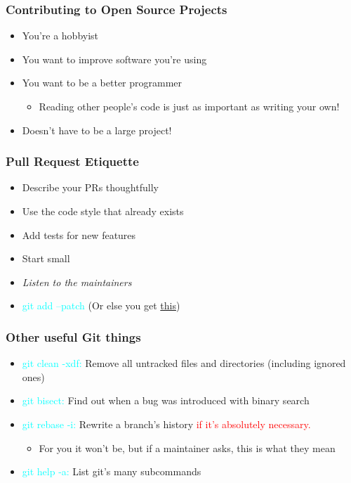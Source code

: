 \documentclass[glossy]{beamer}
\begin{document}
\begin{frame}[fragile=singleslide]
  \frametitle{Contributing to Open Source Projects}

  \begin{itemize}
    \item You're a hobbyist
    \item You want to improve software you're using
    \item You want to be a better programmer
    \begin{itemize}
      \item Reading other people's code is just as important as writing your own!
    \end{itemize}
    \item Doesn't have to be a large project!
  \end{itemize}
\end{frame}

\begin{frame}[fragile=singleslide]
  \frametitle{Pull Request Etiquette}

  \begin{itemize}
    \item Describe your PRs thoughtfully
    \item Use the code style that already exists
    \item Add tests for new features
    \item Start small
    \item \emph{Listen to the maintainers}
    \item \textcolor{cyan}{git add --patch} (Or else you get \href{https://github.com/g-truc/glm/commit/1b9872138de05f993570062ffa30175ef843f6f7#diff-0}{this})
  \end{itemize}
\end{frame}

\begin{frame}[fragile=singleslide]
  \frametitle{Other useful Git things}

  \begin{itemize}
    \item \textcolor{cyan}{git clean -xdf:} Remove all untracked files and directories (including ignored ones)
    \item \textcolor{cyan}{git bisect:} Find out when a bug was introduced with binary search
    \item \textcolor{cyan}{git rebase -i:} Rewrite a branch's history \textcolor{red}{if it's absolutely necessary.}
    \begin{itemize}
      \item For you it won't be, but if a maintainer asks, this is what they mean
    \end{itemize}
    \item \textcolor{cyan}{git help -a:} List git's many subcommands
  \end{itemize}
\end{frame}
\end{document}
